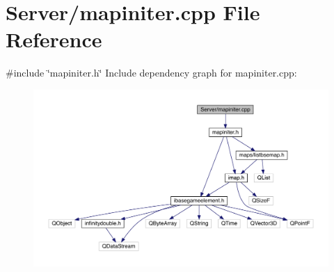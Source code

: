 \hypertarget{a00095}{}\section{Server/mapiniter.cpp File Reference}
\label{a00095}
{\ttfamily \#include \char`\"{}mapiniter.\+h\char`\"{}}\newline
Include dependency graph for mapiniter.\+cpp\+:
\nopagebreak
\begin{figure}[H]
\begin{center}
\leavevmode
\includegraphics[width=350pt]{d9/df8/a00096}
\end{center}
\end{figure}

